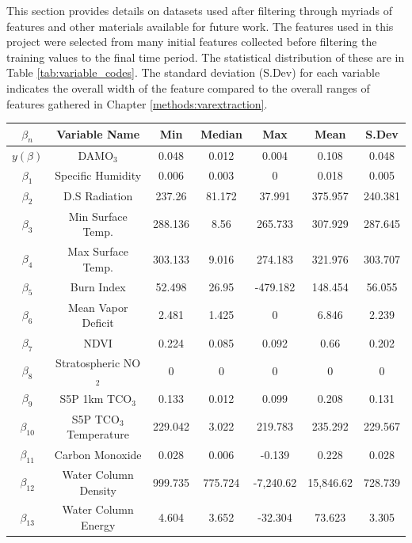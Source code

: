 This section provides details on datasets used after filtering through myriads of features and other materials available for future work. The features used in this project were selected from many initial features collected before filtering the training values to the final time period. The statistical distribution of these are in Table \ref{tab:variable_codes}. The standard deviation (S.Dev) for each variable indicates the overall width of the feature compared to the overall ranges of features gathered in Chapter \ref{methods:varextraction}. \begin{table}[h!]
    \centering
    \begin{tabular}{ccccccc}
        \hline
        \textbf{$\beta_{n}$} & \textbf{Variable Name} & \textbf{Min} & \textbf{Median} & \textbf{Max} & \textbf{Mean}  & \textbf{S.Dev} \\
        \hline
        $y(\beta)$ & DAMO$_3$ & 0.048	& 0.012 & 0.004 & 0.108 & 0.048 \\
        $\beta_{1}$ & Specific Humidity & 0.006	& 0.003 & 0 & 0.018 & 0.005 \\
        $\beta_{2}$ & D.S Radiation & 237.26	& 81.172 & 37.991 & 375.957 & 240.381 \\
        $\beta_{3}$ & Min Surface Temp. & 288.136	& 8.56 & 265.733 & 307.929 & 287.645 \\
        $\beta_{4}$ & Max Surface Temp. & 303.133	& 9.016 & 274.183 & 321.976 & 303.707 \\
        $\beta_{5}$ & Burn Index & 52.498	& 26.95 & -479.182 & 148.454 & 56.055 \\
        $\beta_{6}$ & Mean Vapor Deficit & 2.481	& 1.425 & 0 & 6.846 & 2.239 \\
        $\beta_{7}$ & NDVI & 0.224	& 0.085 & 0.092 & 0.66 & 0.202 \\
        $\beta_{8}$ & Stratospheric NO$_2$ & 0 & 0 & 0 & 0 & 0 \\
        $\beta_{9}$ & S5P 1km TCO$_3$ & 0.133	& 0.012 & 0.099 & 0.208 & 0.131 \\
        $\beta_{10}$ & S5P TCO$_3$ Temperature & 229.042	& 3.022 & 219.783 & 235.292 & 229.567 \\
        $\beta_{11}$ & Carbon Monoxide & 0.028	& 0.006 & -0.139 & 0.228 & 0.028 \\
        $\beta_{12}$ & Water Column Density & 999.735	& 775.724 & -7,240.62 & 15,846.62 & 728.739 \\
        $\beta_{13}$ & Water Column Energy & 4.604	& 3.652 & -32.304 & 73.623 & 3.305 \\

\end{tabular}
\end{table}
